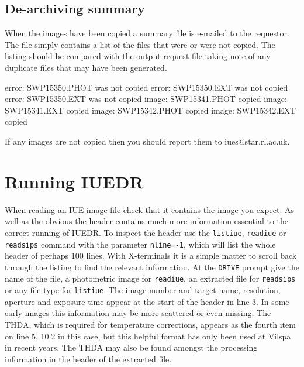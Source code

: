 \documentclass[11pt,twoside,nolof,noabs]{starlink}
\begin{document}
\subsection{De-archiving summary}
When the images have been copied a summary file is e-mailed to the requestor.
The file simply contains a list of the files that were or were not copied.
The listing should be compared with the output request file taking note of any
duplicate files that may have been generated.
\tt
\begin{terminalv}
error: SWP15350.PHOT was not copied
error: SWP15350.EXT  was not copied
error: SWP15350.EXT  was not copied
image: SWP15341.PHOT copied
image: SWP15341.EXT  copied
image: SWP15342.PHOT copied
image: SWP15342.EXT  copied
\end{terminalv}
\rm
If any images are not copied then you should report them to iues@star.rl.ac.uk.


\section{Running IUEDR
\label{readiue}}

When reading an IUE image file check that it contains
the image you expect.
As well as the obvious the header contains much more information essential to
the correct running of IUEDR.
To inspect the header use the \texttt{listiue}, \texttt{readiue} or \texttt{readsips}
command with the
parameter \texttt{nline=-1}, which will list the whole header of perhaps 100 lines.
With X-terminals it is a simple matter to scroll back through the listing to
find the relevant information.
At the \texttt{DRIVE} prompt give the name of the file, a photometric image for
\texttt{readiue}, an extracted file for \texttt{readsips} or any file type
for \texttt{listiue}.
The image number and target name, resolution, aperture and exposure time
appear at the start of the header in line 3. In some early images this
information may be more scattered or even missing.
The THDA, which is required for temperature corrections, appears as the fourth
item on line 5, 10.2 in this case, but this helpful format has only been used
at Vilspa in recent years.
The THDA may also be found amongst the processing information
in the header of the extracted file.
\end{document}
